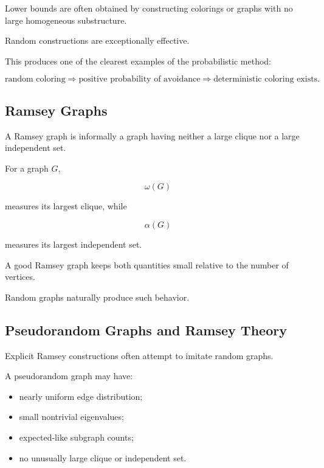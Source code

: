 Lower bounds are often obtained by constructing colorings or graphs
with no large homogeneous substructure.

Random constructions are exceptionally effective.

This produces one of the clearest examples of the probabilistic method:

\[
\boxed{
\text{random coloring}
\Longrightarrow
\text{positive probability of avoidance}
\Longrightarrow
\text{deterministic coloring exists}.
}
\]

\subsection{Ramsey Graphs}
\label{subsec:ramsey-graphs}

A Ramsey graph is informally a graph having neither a large clique nor a
large independent set.

For a graph \(G\),

\[
\omega(G)
\]

measures its largest clique, while

\[
\alpha(G)
\]

measures its largest independent set.

A good Ramsey graph keeps both quantities small relative to the number
of vertices.

Random graphs naturally produce such behavior.

\subsection{Pseudorandom Graphs and Ramsey Theory}
\label{subsec:pseudorandom-ramsey}

Explicit Ramsey constructions often attempt to imitate random graphs.

A pseudorandom graph may have:

\begin{itemize}
    \item nearly uniform edge distribution;
    \item small nontrivial eigenvalues;
    \item expected-like subgraph counts;
    \item no unusually large clique or independent set.
\end{itemize}

